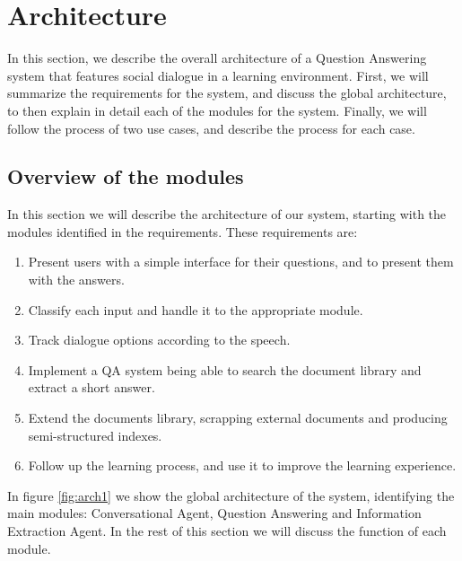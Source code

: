 \chapter{Architecture}
\label{chap:architecture}

\begin{chapterintro}

In this section, we describe the overall architecture of a Question Answering system that features social dialogue in a learning environment. First, we will summarize the requirements for the system, and discuss the global architecture, to then explain in detail each of the modules for the system. Finally, we will follow the process of two use cases, and describe the process for each case.
 
\end{chapterintro}

\cleardoublepage

\section{Overview of the modules}

In this section we will describe the architecture of our system, starting with the modules identified in the requirements. These requirements are:
\begin{enumerate}[label=(\roman*)]
 \item Present users with a simple interface for their questions, and to present them with the answers.
 \item Classify each input  and handle it to the appropriate module.
 \item Track dialogue options according to the speech.
 \item Implement a QA system being able to search the document library and extract a short answer.
 \item Extend the documents library, scrapping external documents and producing semi-structured indexes.
 \item Follow up the learning process, and use it to improve the learning experience. 
\end{enumerate}

In figure \ref{fig:arch1} we show the global architecture of the system, identifying the main modules: Conversational Agent, Question Answering and Information Extraction Agent. In the rest of this section we will discuss the function of each module.

